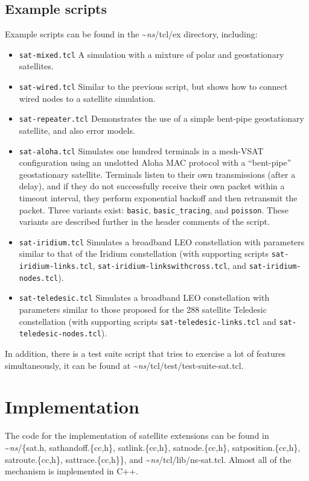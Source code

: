 \subsection{Example scripts}
\label{sec:satellite/usage/example}

Example scripts can be found in the \textasciitilde\emph{ns}/{tcl/ex} directory, including:
\begin{itemize}
\item {\tt sat-mixed.tcl}  A simulation with a mixture of polar and
geostationary satellites.
\item {\tt sat-wired.tcl}  Similar to the previous script, but shows how
to connect wired nodes to a satellite simulation.
\item {\tt sat-repeater.tcl}  Demonstrates the use of a simple bent-pipe
geostationary satellite, and also error models.
\item {\tt sat-aloha.tcl}  Simulates one hundred terminals in a mesh-VSAT
configuration using an unslotted Aloha MAC protocol 
with a ``bent-pipe'' geostationary satellite.  Terminals listen to their
own transmissions (after a delay), and if they do not successfully receive
their own packet within a timeout interval, they perform exponential 
backoff and then retransmit the packet. Three variants exist:
{\tt basic}, {\tt basic\_tracing}, and {\tt poisson}.  These variants
are described further in the header comments of the script.
\item {\tt sat-iridium.tcl}  Simulates a broadband LEO constellation with
parameters similar to that of the Iridium constellation (with supporting
scripts {\tt sat-iridium-links.tcl}, {\tt sat-iridium-linkswithcross.tcl}, 
and {\tt sat-iridium-nodes.tcl}).
\item {\tt sat-teledesic.tcl}  Simulates a broadband LEO constellation with
parameters similar to those proposed for the 288 satellite Teledesic
constellation (with supporting scripts {\tt sat-teledesic-links.tcl} and 
{\tt sat-teledesic-nodes.tcl}).
\end{itemize}
In addition, there is a test suite script that tries to exercise a lot
of features simultaneously, it can be found at \textasciitilde\emph{ns}/{tcl/test/test-suite-sat.tcl}.


\section{Implementation}
\label{sec:satellite/implementation}

The code for the implementation of satellite extensions can be found
in \textasciitilde\emph{ns}/{\{sat.h, sathandoff.\{cc,h\}, satlink.\{cc,h\}, satnode.\{cc,h\}, 
satposition.\{cc,h\}, satroute.\{cc,h\}, sattrace.\{cc,h\}\}}, and
\textasciitilde\emph{ns}/{tcl/lib/ns-sat.tcl}.  Almost all of the mechanism is implemented
in C++.

